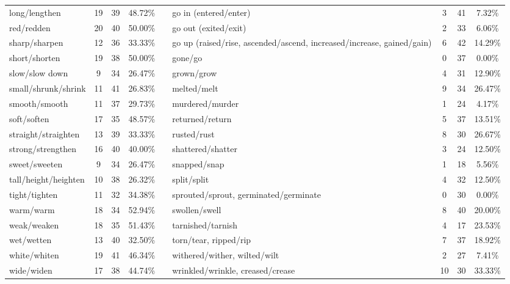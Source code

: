 \begin{tabular}{p{3cm}ccccp{3cm}ccc}
long/lengthen & 19 & 39 & 48.72\% & & go in (entered/enter) & 3 & 41 & 7.32\% \\
red/redden & 20 & 40 & 50.00\% & & go out (exited/exit) & 2 & 33 & 6.06\% \\
sharp/sharpen & 12 & 36 & 33.33\% & & go up (raised/rise, ascended/ascend, increased/increase, gained/gain) & 6 & 42 & 14.29\% \\
short/shorten & 19 & 38 & 50.00\% & & gone/go & 0 & 37 & 0.00\% \\
slow/slow down & 9 & 34 & 26.47\% & & grown/grow & 4 & 31 & 12.90\% \\
small/shrunk/shrink & 11 & 41 & 26.83\% & & melted/melt & 9 & 34 & 26.47\% \\
smooth/smooth & 11 & 37 & 29.73\% & & murdered/murder & 1 & 24 & 4.17\% \\
soft/soften & 17 & 35 & 48.57\% & & returned/return & 5 & 37 & 13.51\% \\
straight/straighten & 13 & 39 & 33.33\% & & rusted/rust & 8 & 30 & 26.67\% \\
strong/strengthen & 16 & 40 & 40.00\% & & shattered/shatter & 3 & 24 & 12.50\% \\
sweet/sweeten & 9 & 34 & 26.47\% & & snapped/snap & 1 & 18 & 5.56\% \\
tall/height/heighten & 10 & 38 & 26.32\% & & split/split & 4 & 32 & 12.50\% \\
tight/tighten & 11 & 32 & 34.38\% & & sprouted/sprout, germinated/germinate & 0 & 30 & 0.00\% \\
warm/warm & 18 & 34 & 52.94\% & & swollen/swell & 8 & 40 & 20.00\% \\
weak/weaken & 18 & 35 & 51.43\% & & tarnished/tarnish & 4 & 17 & 23.53\% \\
wet/wetten & 13 & 40 & 32.50\% & & torn/tear, ripped/rip & 7 & 37 & 18.92\% \\
white/whiten & 19 & 41 & 46.34\% & & withered/wither, wilted/wilt & 2 & 27 & 7.41\% \\
wide/widen & 17 & 38 & 44.74\% & & wrinkled/wrinkle, creased/crease & 10 & 30 & 33.33\%
\end{tabular}